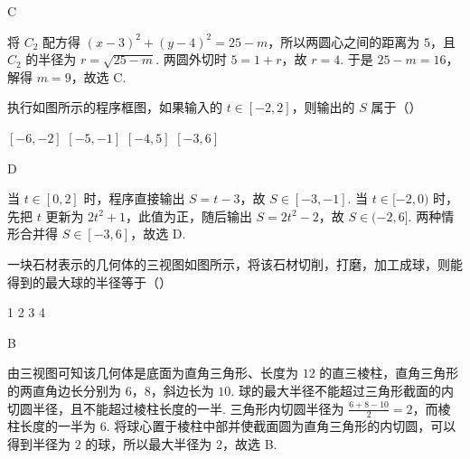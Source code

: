 \begin{answer}
C
\end{answer}

\begin{solution}
将 \(C_2\) 配方得 \((x-3)^2+(y-4)^2=25-m\)，所以两圆心之间的距离为 \(5\)，且 \(C_2\) 的半径为 \(r=\sqrt{25-m}\). 两圆外切时 \(5=1+r\)，故 \(r=4\). 于是 \(25-m=16\)，解得 \(m=9\)，故选 C.
\end{solution}

\begin{problem}
执行如图所示的程序框图，如果输入的 \(t \in [-2, 2]\)，则输出的 \(S\) 属于（\quad）


\choices
    {\([-6, - 2]\)}
    {\([-5, - 1]\)}
    {\([-4, 5]\)}
    {\([-3,6]\)}
\end{problem}

\begin{answer}
D
\end{answer}

\begin{solution}
当 \(t\in[0,2]\) 时，程序直接输出 \(S=t-3\)，故 \(S\in[-3,-1]\). 当 \(t\in[-2,0)\) 时，先把 \(t\) 更新为 \(2t^2+1\)，此值为正，随后输出 \(S=2t^2-2\)，故 \(S\in(-2,6]\). 两种情形合并得 \(S\in[-3,6]\)，故选 D.
\end{solution}

\begin{problem}
一块石材表示的几何体的三视图如图所示，将该石材切削，打磨，加工成球，则能得到的最大球的半径等于（\quad）


\choices
    {1}
    {2}
    {3}
    {4}
\end{problem}

\begin{answer}
B
\end{answer}

\begin{solution}
由三视图可知该几何体是底面为直角三角形、长度为 \(12\) 的直三棱柱，直角三角形的两直角边长分别为 \(6\)，\(8\)，斜边长为 \(10\). 球的最大半径不能超过三角形截面的内切圆半径，且不能超过棱柱长度的一半. 三角形内切圆半径为 \(\frac{6+8-10}{2}=2\)，而棱柱长度的一半为 \(6\). 将球心置于棱柱中部并使截面圆为直角三角形的内切圆，可以得到半径为 \(2\) 的球，所以最大半径为 \(2\)，故选 B.
\end{solution}

